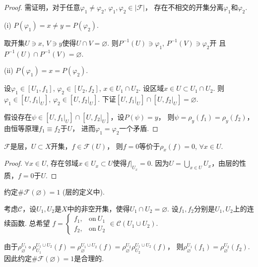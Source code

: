 \begin{proof}
	需证明，对于任意$\varphi_1\neq \varphi_2$, $\varphi_1, \varphi_2\in |\mathscr{F}|$，
    存在不相交的开集分离$\varphi_1$和$\varphi_2$.

	(i) $P(\varphi_1)=x\neq y=P(\varphi_2)$.

	取开集$U\ni x$, $V\ni y$使得$U\cap V=\varnothing$. 
    则$P^{-1}(U)\ni \varphi_1$, $P^{-1}(V)\ni \varphi_2$开
    且$P^{-1}(U)\cap P^{-1}(V)=\varnothing$.

	(ii) $P(\varphi_1)=x=P(\varphi_2)$.

	设$\varphi_1\in [U_1,f_1]$, $\varphi_2\in [U_2, f_2]$, $x\in U_1\cap U_2$. 
    设区域$x\in U\subset U_1\cap U_2$. 
    则$\varphi_1\in [U,f_1|_U]$, $\varphi_2\in [U,f_2|_U]$. 
    下证$[U,f_1|_U]\cap [U,f_2|_U]=\varnothing$.

	假设存在$\psi \in [U,f_1|_U]\cap [U,f_2|_U]$，设$P(\psi)=y$，
    则$\psi=\rho_y(f_1)=\rho_y(f_2)$，由恒等原理$f_1\equiv f_2$于$U$，
    进而$\varphi_1=\varphi_2$一个矛盾.
\end{proof}

\begin{lemma}
	$\mathscr{F}$是层，$U\subset X$开集，$f\in \mathscr{F}(U)$，
    则$f=0$等价于$\rho_x(f)=0$, $\forall x\in U$.
\end{lemma}
		
\begin{proof}
	$\forall x\in U$, 存在邻域$x\in U_x\subset U$使得$f|_{U_x}=0$. 
    因为$U=\bigcup\limits_{x\in U} U_x$，由层的性质，$f=0$于$U$.
\end{proof}
		
\begin{remark}
	约定$\# \mathscr{F}(\varnothing)=1$ (层的定义中).

	考虑$\mathcal{C}$，设$U_1, U_2$是$X$中的非空开集，使得$U_1\cap U_2=\varnothing$. 
    设$f_1, f_2$分别是$U_1, U_2$上的连续函数. 总希望
	$f=\begin{cases}
        f_1, &\text{on}\ U_1\\
		f_2, &\text{on}\ U_2\end{cases} \in \mathcal{C}(U_1\cup U_2)$.

	由于$\rho^{U_1}_\varnothing \circ \rho^{U_1\cup U_2}_{U_1} (f)
    =\rho^{U_1\cup U_2}_\varnothing (f)
    =\rho^{U_2}_\varnothing \rho^{U_1\cup U_2}_{U_2}(f)$，
    则$\rho^{U_1}_\varnothing(f_1)=\rho^{U_2}_\varnothing(f_2)$. 
    因此约定$\#\mathscr{F}(\varnothing)=1$是合理的.		
\end{remark}


